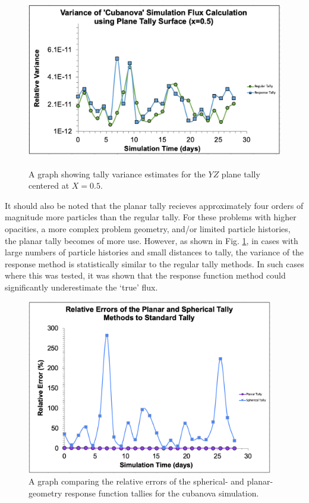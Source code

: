 \documentclass[]{article}
\begin{document}
		\begin{figure} [h!]
			\centering
			\includegraphics[height=3in]{Figures/plane_avg_x=0_5.png}
			\caption{A graph showing tally variance estimates for the $YZ$ plane tally centered at $X=0.5$. }
			\label{fig:plane_avg_x=0.5.png}
		\end{figure}
		
		It should also be noted that the planar tally recieves approximately four orders of magnitude more particles than the regular tally. For these problems with higher opacities, a more complex problem geometry, and/or limited particle histories, the planar tally becomes of more use. However, as shown in Fig. \ref{fig:plane_avg_x=0.5.png}, in cases with large numbers of particle histories and small distances to tally, the variance of the response method is statistically similar to the regular tally methods. In such cases where this was tested, it was shown that the response function method could significantly underestimate the `true' flux.
		
		\begin{figure} [h!]
			\centering
			\includegraphics[height=3in]{Figures/relative_errors.png}
			\caption{A graph comparing the relative errors of the spherical- and planar-geometry response function tallies for the cubanova simulation. }
			\label{fig:relative_errors}
		\end{figure}
	
\end{document}
